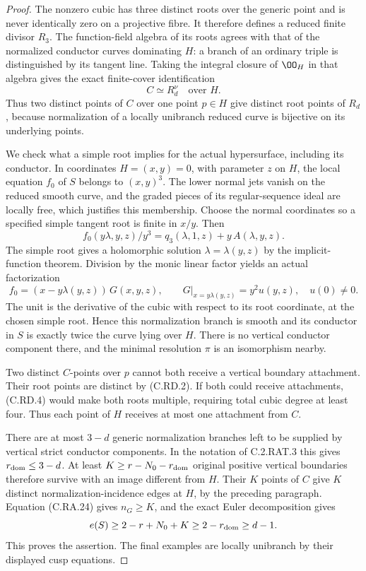 \begin{proof}
The nonzero cubic has three distinct roots over the generic
point and is never identically zero on a projective fibre.
It therefore defines a reduced finite divisor $R_3$.
The function-field algebra of its roots agrees with that of
the normalized conductor curves dominating $H$: a branch
of an ordinary triple is distinguished by its tangent line.
Taking the integral closure of $\OO_H$ in that algebra gives
the exact finite-cover identification
\[
                            C\simeq R_d^\nu
                            \quad\text{over }H.
\tag{C.RD.2}
\]
Thus two distinct points of $C$ over one point $p\in H$
give distinct root points of $R_d$, because normalization
of a locally unibranch reduced curve is bijective on its
underlying points.

We check what a simple root implies for the actual
hypersurface, including its conductor. In coordinates
$H=(x,y)=0$, with parameter $z$ on $H$, the local equation
$f_0$ of $S$ belongs to $(x,y)^3$. The lower normal jets
vanish on the reduced smooth curve, and the graded pieces
of its regular-sequence ideal are locally free, which
justifies this membership. Choose the normal coordinates
so a specified simple tangent root is finite in $x/y$.
Then
\[
 f_0(y\lambda,y,z)/y^3
       =q_3(\lambda,1,z)+y\,A(\lambda,y,z).
\tag{C.RD.3}
\]
The simple root gives a holomorphic solution
$\lambda=\lambda(y,z)$ by the implicit-function theorem.
Division by the monic linear factor yields an actual
factorization
\[
 f_0=(x-y\lambda(y,z))\,G(x,y,z),\qquad
 G|_{x=y\lambda(y,z)}=y^2 u(y,z),\quad u(0)\ne0.
\tag{C.RD.4}
\]
The unit is the derivative of the cubic with respect to
its root coordinate, at the chosen simple root. Hence
this normalization branch is smooth and its conductor
in $S$ is exactly twice the curve lying over $H$.
There is no vertical conductor component there, and
the minimal resolution $\pi$ is an isomorphism nearby.

Two distinct $C$-points over $p$ cannot both receive a
vertical boundary attachment. Their root points are
distinct by (C.RD.2). If both could receive attachments,
(C.RD.4) would make both roots multiple, requiring total
cubic degree at least four. Thus each point of $H$
receives at most one attachment from $C$.

There are at most $3-d$ generic normalization branches
left to be supplied by vertical strict conductor
components. In the notation of C.2.RAT.3 this gives
$r_{\rm dom}\le3-d$. At least
$K\ge r-N_0-r_{\rm dom}$ original positive vertical
boundaries therefore survive with an image different
from $H$. Their $K$ points of $C$ give $K$ distinct
normalization-incidence edges at $H$, by the preceding
paragraph. Equation (C.RA.24) gives $n_G\ge K$, and
the exact Euler decomposition gives
\[
 e(S)\ge2-r+N_0+K
       \ge2-r_{\rm dom}\ge d-1.
\]
This proves the assertion. The final examples are locally
unibranch by their displayed cusp equations.
\end{proof}

